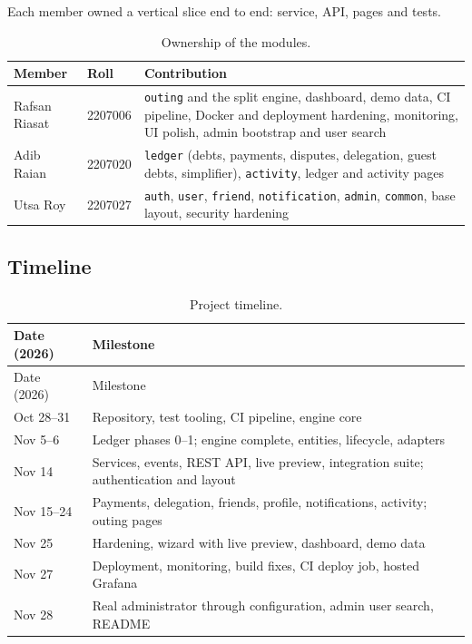 \documentclass[10pt,a4paper]{article}
\newcommand{\code}[1]{\texttt{#1}}
\begin{document}
Each member owned a vertical slice end to end: service, API, pages and tests.

\begin{table}[H]
\centering\small
\caption{Ownership of the modules.}
\begin{tabularx}{\textwidth}{@{}>{\raggedright\arraybackslash}p{3.0cm}l Y@{}}
\toprule
Member & Roll & Contribution \\
\midrule
Rafsan Riasat & 2207006 & \code{outing} and the split engine, dashboard, demo data, CI pipeline, Docker and deployment hardening, monitoring, UI polish, admin bootstrap and user search \\
Adib Raian & 2207020 & \code{ledger} (debts, payments, disputes, delegation, guest debts, simplifier), \code{activity}, ledger and activity pages \\
Utsa Roy & 2207027 & \code{auth}, \code{user}, \code{friend}, \code{notification}, \code{admin}, \code{common}, base layout, security hardening \\
\bottomrule
\end{tabularx}
\end{table}

\subsection{Timeline}

{\small
\begin{longtable}{@{}>{\raggedright\arraybackslash}p{2.6cm}>{\raggedright\arraybackslash}p{12.9cm}@{}}
\caption{Project timeline.}\\
\toprule
Date (2026) & Milestone \\
\midrule
\endfirsthead
\toprule
Date (2026) & Milestone \\
\midrule
\endhead
\bottomrule
\endfoot
Oct 28--31 & Repository, test tooling, CI pipeline, engine core \\
Nov 5--6 & Ledger phases 0--1; engine complete, entities, lifecycle, adapters \\
Nov 14 & Services, events, REST API, live preview, integration suite; authentication and layout \\
Nov 15--24 & Payments, delegation, friends, profile, notifications, activity; outing pages \\
Nov 25 & Hardening, wizard with live preview, dashboard, demo data \\
Nov 27 & Deployment, monitoring, build fixes, CI deploy job, hosted Grafana \\
Nov 28 & Real administrator through configuration, admin user search, README \\
\end{longtable}}
\end{document}
